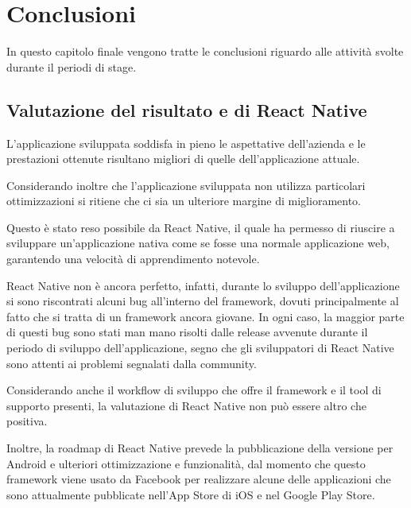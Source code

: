 
\chapter{Conclusioni}
\label{cap:conclusioni}

In questo capitolo finale vengono tratte le conclusioni riguardo alle attività svolte durante il periodi di stage.

\section{Valutazione del risultato e di React Native}

L'applicazione sviluppata soddisfa in pieno le aspettative dell'azienda e le prestazioni ottenute risultano migliori di quelle dell'applicazione attuale.

Considerando inoltre che l'applicazione sviluppata non utilizza particolari ottimizzazioni si ritiene che ci sia un ulteriore margine di miglioramento.

Questo è stato reso possibile da React Native, il quale ha permesso di riuscire a sviluppare un'applicazione nativa come se fosse una normale applicazione web, garantendo una velocità di apprendimento notevole.

React Native non è ancora perfetto, infatti, durante lo sviluppo dell'applicazione si sono riscontrati alcuni bug all'interno del framework, dovuti principalmente al fatto che si tratta di un framework ancora giovane.
In ogni caso, la maggior parte di questi bug sono stati man mano risolti dalle release avvenute durante il periodo di sviluppo dell'applicazione, segno che gli sviluppatori di React Native sono attenti ai problemi segnalati dalla community.

Considerando anche il workflow di sviluppo che offre il framework e il tool di supporto presenti, la valutazione di React Native non può essere altro che positiva.

Inoltre, la roadmap di React Native prevede la pubblicazione della versione per Android e ulteriori ottimizzazione e funzionalità, dal momento che questo framework viene usato da Facebook per realizzare alcune delle applicazioni che sono attualmente pubblicate nell'App Store di iOS e nel Google Play Store.

